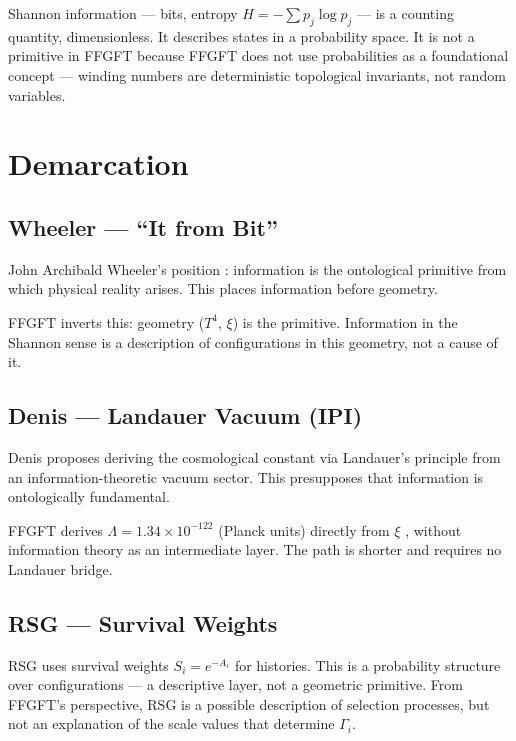Shannon information \cite{Shannon1948} — bits, entropy
$H = -\sum p_j \log p_j$ — is a counting quantity, dimensionless. It
describes states in a probability space. It is not a primitive in FFGFT
because FFGFT does not use probabilities as a foundational concept —
winding numbers are deterministic topological invariants, not random
variables.

\section{Demarcation}

\subsection{Wheeler — ``It from Bit''}

John Archibald Wheeler's position \cite{Wheeler1990}: information is
the ontological primitive from which physical reality arises. This places
information before geometry.

FFGFT inverts this: geometry ($T^4$, $\xi$) is the primitive. Information
in the Shannon sense is a description of configurations in this geometry,
not a cause of it.

\subsection{Denis — Landauer Vacuum (IPI)}

Denis \cite{Denis2023} proposes deriving the cosmological constant via
Landauer's principle from an information-theoretic vacuum sector. This
presupposes that information is ontologically fundamental.

FFGFT derives $\Lambda = 1.34 \times 10^{-122}$ (Planck units) directly
from $\xi$ \cite{Pascher_182}, without information theory as an
intermediate layer. The path is shorter and requires no Landauer bridge.

\subsection{RSG — Survival Weights}

RSG \cite{Austin2026} uses survival weights $S_i = e^{-A_i}$ for
histories. This is a probability structure over configurations — a
descriptive layer, not a geometric primitive. From FFGFT's perspective,
RSG is a possible description of selection processes, but not an
explanation of the scale values that determine $\Gamma_i$.

